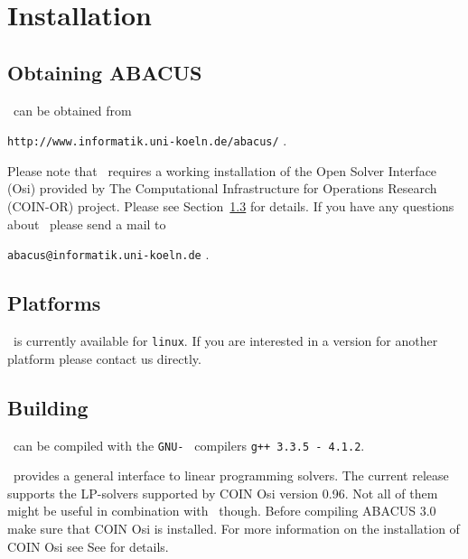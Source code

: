 


\chapter{Installation}
\label{chapter:installation}

\section{Obtaining ABACUS}

\ABACUS\ can be obtained from
\begin{center}
{\tt http://www.informatik.uni-koeln.de/abacus/} .
\end{center}
Please note that \ABACUS\ requires a working installation of the Open Solver Interface (Osi) provided by The Computational Infrastructure for Operations Research (COIN-OR) project. Please see Section~\ref{section:lpsolver} for details.
If you have any questions about \ABACUS\, please send a mail to
\begin{center}
{\tt abacus@informatik.uni-koeln.de} .
\end{center}

\section{Platforms}
\label{section:platforms}

\ABACUS\ is currently available for {\tt linux}.
If you are interested in a version for another platform please contact us directly.

\section{Building \ABACUS\ }
\label{section:lpsolver}

\ABACUS\ can be compiled with the {\tt GNU-\CPLUSPLUS\ } compilers {\tt g++ 3.3.5 - 4.1.2}.

\ABACUS\ provides a general interface to linear programming solvers.
The current release supports the LP-solvers supported by COIN Osi version 0.96.
Not all of them might be useful in combination with \ABACUS\, though.
Before compiling ABACUS 3.0 make sure that COIN Osi is installed.
For more information on the installation of COIN Osi see
See  for details.


